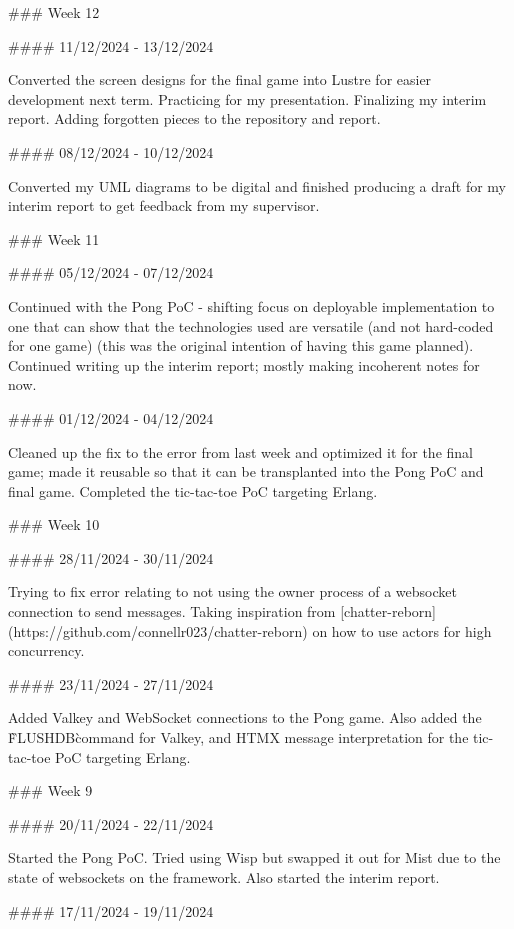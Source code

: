 \documentclass[]{final}
\begin{document}
\begin{markdown}

  ### Week 12

  #### 11/12/2024 - 13/12/2024

  Converted the screen designs for the final game into Lustre for easier
  development next term. Practicing for my presentation. Finalizing my interim
  report. Adding forgotten pieces to the repository and report.

  #### 08/12/2024 - 10/12/2024

  Converted my UML diagrams to be digital and finished producing a draft for my
  interim report to get feedback from my supervisor.

  ### Week 11

  #### 05/12/2024 - 07/12/2024

  Continued with the Pong PoC - shifting focus on deployable implementation to one
  that can show that the technologies used are versatile (and not hard-coded for
  one game) (this was the original intention of having this game planned).
  Continued writing up the interim report; mostly making incoherent notes for now.

  #### 01/12/2024 - 04/12/2024

  Cleaned up the fix to the error from last week and optimized it for the final
  game; made it reusable so that it can be transplanted into the Pong PoC and
  final game. Completed the tic-tac-toe PoC targeting Erlang.

  ### Week 10

  #### 28/11/2024 - 30/11/2024

  Trying to fix error relating to not using the owner process of a websocket
  connection to send messages. Taking inspiration from
    [chatter-reborn](https://github.com/connellr023/chatter-reborn) on how to use
  actors for high concurrency.

  #### 23/11/2024 - 27/11/2024

  Added Valkey and WebSocket connections to the Pong game. Also added the
  \`FLUSHDB\` command for Valkey, and HTMX message interpretation for the
  tic-tac-toe PoC targeting Erlang.

  ### Week 9

  #### 20/11/2024 - 22/11/2024

  Started the Pong PoC. Tried using Wisp but swapped it out for Mist due to the
  state of websockets on the framework. Also started the interim report.

  #### 17/11/2024 - 19/11/2024


\end{markdown}
\end{document}
